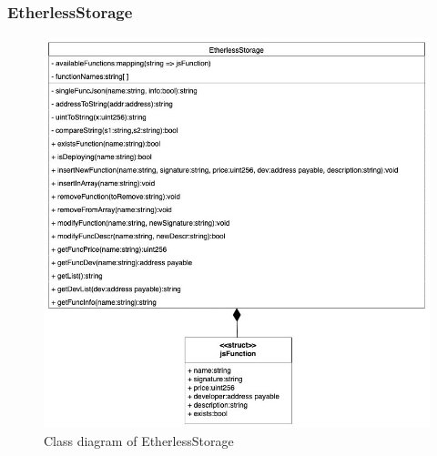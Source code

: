 \subsubsection{EtherlessStorage}
	\begin{figure}[H]
		\centering
		\includegraphics[width=0.6\linewidth]{diagrammi/etherless-smart/EtherlessStorage.jpg}
		\caption{Class diagram of EtherlessStorage}
	\end{figure}

